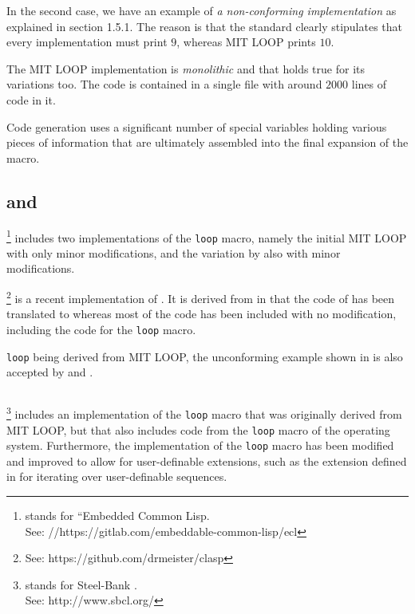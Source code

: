 In the second case, we have an example of \emph{a non-conforming
  implementation} as explained in section 1.5.1.  The reason is that
the standard clearly stipulates that every implementation must print
$9$, whereas MIT LOOP prints $10$.

The MIT LOOP implementation is \emph{monolithic} and that holds true
for its variations too.  The code is contained in a single file with
around $2000$ lines of code in it.

Code generation uses a significant number of special variables holding
various pieces of information that are ultimately assembled into the
final expansion of the macro.

\subsection{\ecl{} and \clasp{}}

\ecl{}%
\footnote{\ecl{} stands for ``Embedded Common Lisp.\\
See: //https://gitlab.com/embeddable-common-lisp/ecl}
includes two implementations of the \texttt{loop} macro, namely
the initial MIT LOOP with only minor modifications, and the variation
by \symbolics{} also with minor modifications.

\clasp{}%
\footnote{See: https://github.com/drmeister/clasp}
is a recent implementation of \commonlisp{}.  It is derived
from \ecl{} in that the \clanguage{} code of \ecl{} has been
translated to \cplusplus{} whereas most of the \commonlisp{} code has
been included with no modification, including the code for the
\texttt{loop} macro.

\ecl{} \texttt{loop} being derived from MIT LOOP, the unconforming
example shown in  is also accepted by \ecl{} and
\clasp{}.

\subsection{\sbcl{}}

\sbcl{}%
\footnote{\sbcl{} stands for Steel-Bank \commonlisp{}.\\
See: http://www.sbcl.org/}
includes an implementation of the \texttt{loop} macro that was
originally derived from MIT LOOP, but that also includes code from the
\texttt{loop} macro of the \genera{} operating system.  Furthermore,
the \sbcl{} implementation of the \texttt{loop} macro has been
modified and improved to allow for user-definable extensions, such as
the extension defined in \cite{Rhodes:2007:USC:1622123.1622138} for
iterating over user-definable sequences.

